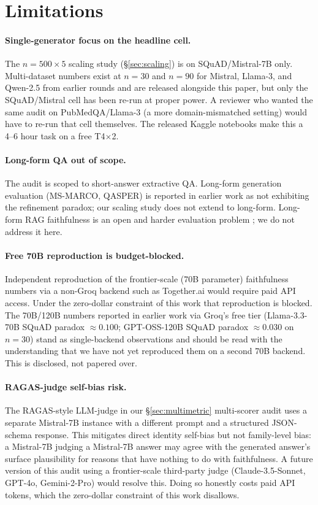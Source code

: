 \section{Limitations}
\label{sec:limitations}

\paragraph{Single-generator focus on the headline cell.}
The $n{=}500{\times}5$ scaling study (\S\ref{sec:scaling}) is on
SQuAD/Mistral-7B only. Multi-dataset numbers exist at $n{=}30$ and
$n{=}90$ for Mistral, Llama-3, and Qwen-2.5 from earlier rounds and
are released alongside this paper, but only the SQuAD/Mistral cell
has been re-run at proper power. A reviewer who wanted the same
audit on PubMedQA/Llama-3 (a more domain-mismatched setting) would
have to re-run that cell themselves. The released Kaggle notebooks
make this a 4--6 hour task on a free T4\(\times\)2.

\paragraph{Long-form QA out of scope.}
The audit is scoped to short-answer extractive QA. Long-form
generation evaluation (MS-MARCO, QASPER) is reported in earlier
work as not exhibiting the refinement paradox; our scaling study
does not extend to long-form. Long-form RAG faithfulness is an
open and harder evaluation problem
\citep{krishna2021hurdles}; we do not address it here.

\paragraph{Free 70B reproduction is budget-blocked.}
Independent reproduction of the frontier-scale (70B parameter)
faithfulness numbers via a non-Groq backend such as Together.ai
would require paid API access. Under the zero-dollar constraint
of this work that reproduction is blocked. The 70B/120B numbers
reported in earlier work via Groq's free tier (Llama-3.3-70B
SQuAD paradox $\approx 0.100$; GPT-OSS-120B SQuAD paradox
$\approx 0.030$ on $n{=}30$) stand as single-backend observations
and should be read with the understanding that we have not yet
reproduced them on a second 70B backend. This is disclosed, not
papered over.

\paragraph{RAGAS-judge self-bias risk.}
The RAGAS-style LLM-judge in our \S\ref{sec:multimetric}
multi-scorer audit uses a separate Mistral-7B instance with a
different prompt and a structured JSON-schema response. This
mitigates direct identity self-bias but not family-level bias: a
Mistral-7B judging a Mistral-7B answer may agree with the
generated answer's surface plausibility for reasons that have
nothing to do with faithfulness. A future version of this audit
using a frontier-scale third-party judge (Claude-3.5-Sonnet,
GPT-4o, Gemini-2-Pro) would resolve this. Doing so honestly costs
paid API tokens, which the zero-dollar constraint of this work
disallows.

